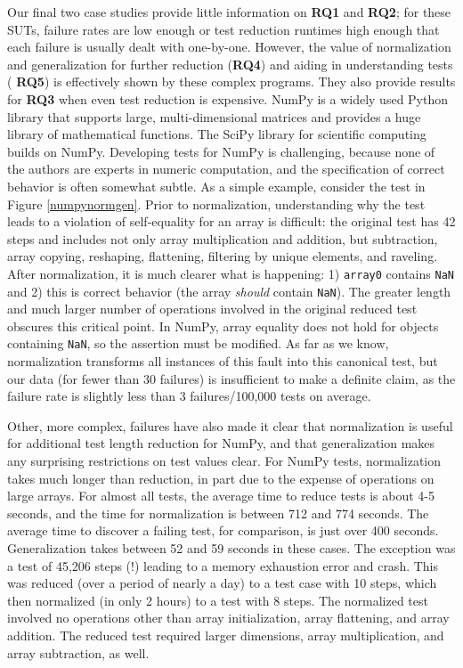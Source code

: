 Our final two case studies provide little information on {\bf RQ1} and
{\bf RQ2}; for these SUTs, failure rates are low enough or test
reduction runtimes high enough that each failure is usually dealt with
one-by-one.  However, the value of normalization and generalization
for further reduction ({\bf RQ4}) and aiding in understanding tests ({\bf
  RQ5}) is effectively shown by these complex programs.  They also provide
results for {\bf RQ3} when even test reduction is expensive.
NumPy \cite{NumPy} is a widely used Python library that
supports large, multi-dimensional matrices and provides a huge library
of mathematical functions.  The SciPy library for scientific
computing builds on NumPy.  Developing tests for NumPy is challenging,
because none of the authors are experts in numeric computation, and
the specification of correct behavior is often somewhat subtle.  As a
simple example, consider the test in Figure \ref{numpynormgen}.  Prior to
normalization, understanding why the test leads to a violation of
self-equality for an array is difficult: the original test has 42
steps and includes not only array multiplication and addition, but
subtraction, array copying, reshaping, flattening,  filtering by
unique elements, and raveling.  After
normalization, it is much clearer what is happening: 1) {\tt array0}
contains {\tt NaN} and 2) this is correct behavior (the array
\emph{should} contain {\tt NaN}).  The greater length and much larger
number of operations involved in the original reduced test
obscures this critical point.  In NumPy, array equality does not hold
for objects containing {\tt NaN}, so the assertion must be modified.
As far as we know, normalization transforms all instances of this
fault into this canonical test, but our data (for fewer than 30
failures) is insufficient to make a definite claim, as the failure rate
is slightly less than 3 failures/100,000 tests on average.

Other, more complex, failures have also made it clear that
normalization is useful for additional test length reduction for
NumPy, and that generalization makes any surprising restrictions on
test values clear.  For NumPy tests, normalization takes much longer
than reduction, in part due to the expense of operations on large
arrays.  For almost all tests, the average time to reduce tests
is about 4-5 seconds, and the time for normalization is between 712
and 774 seconds.  The average time to discover a failing test,
for comparison, is just over 400 seconds.  Generalization takes
between 52 and 59 seconds in these cases.  The exception was a test of 45,206 steps (!)  leading to a memory exhaustion error and
crash.  This was reduced (over a period of nearly a day) to a test
case with 10 steps, which then normalized (in only 2 hours) to a test
with 8 steps.  The normalized test involved no operations other than array
initialization, array flattening, and array
addition.  The reduced test required larger dimensions, array
multiplication, and array subtraction, as well.  



